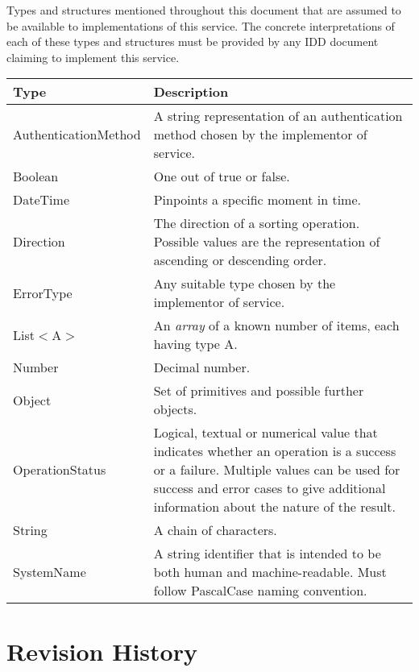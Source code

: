 \documentclass[a4paper]{arrowhead}
\newcommand{\pdef}[1]{{\textcolor{ArrowheadGrey}{#1\label{sec:model:primitives:#1}\label{sec:model:primitives:#1s}\label{sec:model:primitives:#1es}}}}
\begin{document}
Types and structures mentioned throughout this document that are assumed to be available to implementations of this service.
The concrete interpretations of each of these types and structures must be provided by any IDD document claiming to implement this service.

\begin{table}[ht!]
\begin{tabularx}{\textwidth}{| p{3.5cm} | X |} \hline
\rowcolor{gray!33} Type & Description \\ \hline
\pdef{AuthenticationMethod} & A string representation of an authentication method chosen by the implementor of service. \\ \hline
\pdef{Boolean}          & One out of true or false. \\ \hline
\pdef{DateTime}         & Pinpoints a specific moment in time. \\ \hline
\pdef{Direction}        & The direction of a sorting operation. Possible values are the representation of ascending or descending order. \\ \hline
\pdef{ErrorType}        & Any suitable type chosen by the implementor of service. \\ \hline
\pdef{List}$<$A$>$      & An \textit{array} of a known number of items, each having type A. \\ \hline
\pdef{Number}           & Decimal number. \\ \hline
\pdef{Object}           & Set of primitives and possible further objects. \\ \hline
\pdef{OperationStatus}  & Logical, textual or numerical value that indicates whether an operation is a success or a failure. Multiple values can be used for success and error cases to give additional information about the nature of the result. \\ \hline
\pdef{String}           & A chain of characters. \\ \hline
\pdef{SystemName}       & A string identifier that is intended to be both human and machine-readable. Must follow PascalCase naming convention. \\ \hline\end{tabularx}
\end{table}

\newpage




\newpage

\section{Revision History}
\end{document}
